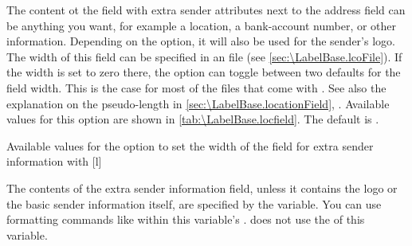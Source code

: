 \begin{Declaration}
\end{Declaration}
%
The content ot the field with extra sender attributes next to the address
field can be anything you want, for example a location, a bank-account number,
or other information. Depending on the
 option, it will also be used for the
sender's logo. The width of this field can be specified in an  file
(see \autoref{sec:\LabelBase.lcoFile}). If the width is set to zero there, the
 option can toggle between two defaults for the field width.
This is the case for most of the  files that come with
\KOMAScript{}. See also the explanation on the 
pseudo-length in \autoref{sec:\LabelBase.locationField},
. Available values for this
option are shown in \autoref{tab:\LabelBase.locfield}. The default is
.%
%
\begin{table}
  \setcapindent{0pt}%
  \begin{captionbeside}
    {Available values for the  option to
      set the width of the field for extra sender information with
      \label{tab:\LabelBase.locfield}}%
    [l]
    \begin{minipage}[t]{.45\linewidth}
      \begin{desctabular}[t]
      \end{desctabular}
    \end{minipage}
  \end{captionbeside}
\end{table}

\begin{Declaration}
\end{Declaration}
The contents of the extra sender information field, unless it contains
the logo or the basic sender information itself, are specified by the
 variable. You can use formatting commands like
 within this variable's . \KOMAScript{} does
not use the  of this variable.

